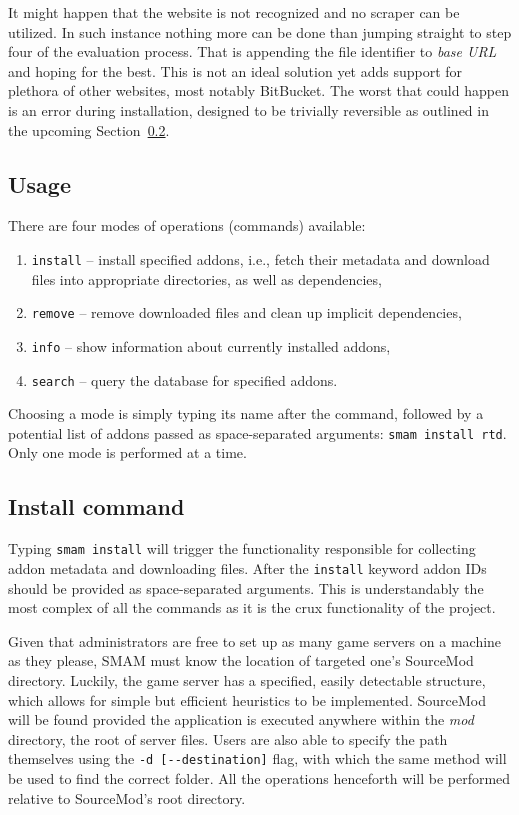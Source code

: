 It might happen that the website is not recognized and no scraper can be utilized.
In such instance nothing more can be done than jumping straight to step four of the evaluation process.
That is appending the file identifier to \textit{base URL} and hoping for the best.
This is not an ideal solution yet adds support for plethora of other websites, most notably BitBucket.
The worst that could happen is an error during installation, designed to be trivially reversible as outlined in the upcoming Section~\ref{install-command}.

\subsection{Usage}

There are four modes of operations (commands) available:
\begin{enumerate}
    \item \verb|install| -- install specified addons, i.e., fetch their metadata and download files into appropriate directories, as well as dependencies,
    \item \verb|remove| -- remove downloaded files and clean up implicit dependencies,
    \item \verb|info| -- show information about currently installed addons,
    \item \verb|search| -- query the database for specified addons.
\end{enumerate}

Choosing a mode is simply typing its name after the command, followed by a potential list of addons passed as space-separated arguments: \verb|smam install rtd|.
Only one mode is performed at a time.

\subsection{Install command}
\label{install-command}

Typing \verb|smam install| will trigger the functionality responsible for collecting addon metadata and downloading files.
After the \verb|install| keyword addon IDs should be provided as space-separated arguments.
This is understandably the most complex of all the commands as it is the crux functionality of the project.

Given that administrators are free to set up as many game servers on a machine as they please, SMAM must know the location of targeted one's SourceMod directory.
Luckily, the game server has a specified, easily detectable structure, which allows for simple but efficient heuristics to be implemented.
SourceMod will be found provided the application is executed anywhere within the \textit{mod} directory, the root of server files.
Users are also able to specify the path themselves using the \verb|-d [--destination]| flag, with which the same method will be used to find the correct folder.
All the operations henceforth will be performed relative to SourceMod's root directory.

